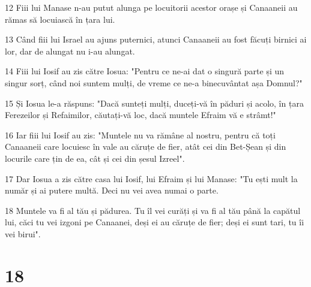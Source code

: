 \par 12 Fiii lui Manase n-au putut alunga pe locuitorii acestor orașe și Canaaneii au rămas să locuiască în țara lui.
\par 13 Când fiii lui Israel au ajuns puternici, atunci Canaaneii au fost făcuți birnici ai lor, dar de alungat nu i-au alungat.
\par 14 Fiii lui Iosif au zis către Iosua: "Pentru ce ne-ai dat o singură parte și un singur sorț, când noi suntem mulți, de vreme ce ne-a binecuvântat așa Domnul?"
\par 15 Și Iosua le-a răspuns: "Dacă sunteți mulți, duceți-vă în păduri și acolo, în țara Ferezeilor și Refaimilor, căutați-vă loc, dacă muntele Efraim vă e strâmt!"
\par 16 Iar fiii lui Iosif au zis: "Muntele nu va rămâne al nostru, pentru că toți Canaaneii care locuiesc în vale au căruțe de fier, atât cei din Bet-Șean și din locurile care țin de ea, cât și cei din șesul Izreel".
\par 17 Dar Iosua a zis către casa lui Iosif, lui Efraim și lui Manase: "Tu ești mult la număr și ai putere multă. Deci nu vei avea numai o parte.
\par 18 Muntele va fi al tău și pădurea. Tu îl vei curăți și va fi al tău până la capătul lui, căci tu vei izgoni pe Canaanei, deși ei au căruțe de fier; deși ei sunt tari, tu îi vei birui".

\chapter{18}

